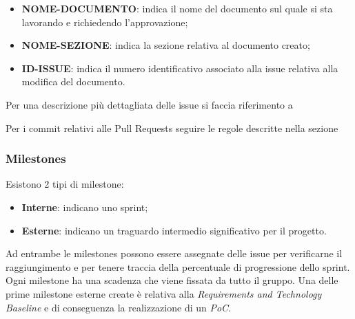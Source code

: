         \begin{itemize}
            \item \textbf{NOME-DOCUMENTO}: indica il nome del documento sul quale si sta lavorando e richiedendo l'approvazione;
            \item \textbf{NOME-SEZIONE}: indica la sezione relativa al documento creato;
            \item \textbf{ID-ISSUE}: indica il numero identificativo associato alla issue relativa alla modifica del documento.
        \end{itemize}

        Per una descrizione più dettagliata delle issue si faccia riferimento a 

        Per i commit relativi alle Pull Requests seguire le regole descritte nella sezione 

        \subsubsection{Milestones}
        Esistono 2 tipi di milestone:
        \begin{itemize}
            \item \textbf{Interne}: indicano uno sprint;
            \item \textbf{Esterne}: indicano un traguardo intermedio significativo per il progetto.
        \end{itemize}
        Ad entrambe le milestones possono essere assegnate delle issue per verificarne il raggiungimento e per tenere traccia
        della percentuale di progressione dello sprint.
        Ogni milestone ha una scadenza che viene fissata da tutto il gruppo. Una delle prime milestone esterne create è
        relativa alla \textit{Requirements and Technology Baseline} e di conseguenza la realizzazione di un \textit{PoC}.


